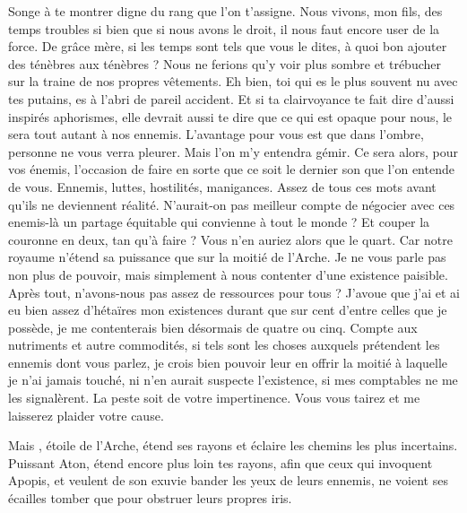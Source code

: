 \scene

\StageDirII{\reine, \vladimir}



\begin{drama}
  \reinespeaks    Songe à te montrer digne du rang que l’on t’assigne. Nous vivons, mon fils, des temps troubles si bien que si nous avons le droit, il nous faut encore user de la force.
  \vladimirspeaks De grâce mère, si les temps sont tels que vous le dites, à quoi bon ajouter des ténèbres aux ténèbres ? Nous ne ferions qu’y voir plus sombre et trébucher sur la traine de nos propres vêtements.
  \reinespeaks    Eh bien, toi qui es le plus souvent nu avec tes putains, es à l’abri de pareil accident. Et si ta clairvoyance te fait dire d’aussi inspirés aphorismes, elle devrait aussi te dire que ce qui est opaque pour nous, le sera tout autant à nos ennemis. L’avantage pour vous est que dans l’ombre, personne ne vous verra pleurer.
  \vladimirspeaks Mais l’on m’y entendra gémir.
  \reinespeaks Ce sera alors, pour vos énemis, l’occasion de faire en sorte que ce soit le dernier son que l’on entende de vous.
  \vladimirspeaks Ennemis, luttes, hostilités, manigances. Assez de tous ces mots avant qu’ils ne deviennent réalité. N’aurait-on pas meilleur compte de négocier avec ces enemis-là un partage équitable qui convienne à tout le monde ?
  \reinespeaks Et couper la  couronne en deux, tan qu’à faire ? Vous n’en auriez alors que le quart. Car notre royaume n’étend sa puissance que sur la moitié de l’Arche.
  \vladimirspeaks Je ne vous parle pas non plus de pouvoir, mais simplement à nous contenter d’une existence paisible. Après tout, n’avons-nous pas assez de ressources pour tous ? J’avoue que j’ai et ai eu bien assez d’hétaïres mon existences durant que sur cent d’entre celles que je possède, je me contenterais bien désormais de quatre ou cinq. Compte aux nutriments et autre commodités, si tels sont les choses auxquels prétendent les ennemis dont vous parlez, je crois bien pouvoir leur en offrir la moitié à laquelle je n’ai jamais touché, ni n’en aurait suspecte l’existence, si mes comptables ne me les signalèrent.
  \reinespeaks La peste soit de votre impertinence. Vous vous tairez et me laisserez plaider votre cause.

  \choirspeaks Mais \elena, étoile de l’Arche, étend ses rayons et éclaire les chemins les plus incertains. Puissant Aton, étend encore plus loin tes rayons, afin que ceux qui invoquent Apopis, et veulent de son exuvie bander les yeux de leurs ennemis, ne voient ses écailles tomber que pour obstruer leurs propres iris.

\end{drama}



